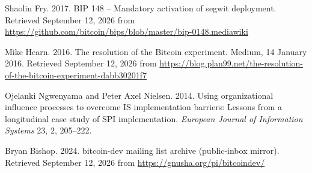 Shaolin Fry. 2017. BIP 148 -- Mandatory activation of segwit deployment. Retrieved September 12, 2026 from \url{https://github.com/bitcoin/bips/blob/master/bip-0148.mediawiki}

Mike Hearn. 2016. The resolution of the Bitcoin experiment. Medium, 14 January 2016. Retrieved September 12, 2026 from \url{https://blog.plan99.net/the-resolution-of-the-bitcoin-experiment-dabb30201f7}

Ojelanki Ngwenyama and Peter Axel Nielsen. 2014. Using organizational influence processes to overcome IS implementation barriers: Lessons from a longitudinal case study of SPI implementation. \emph{European Journal of Information Systems} 23, 2, 205--222.

Bryan Bishop. 2024. bitcoin-dev mailing list archive (public-inbox mirror). Retrieved September 12, 2026 from \url{https://gnusha.org/pi/bitcoindev/}
